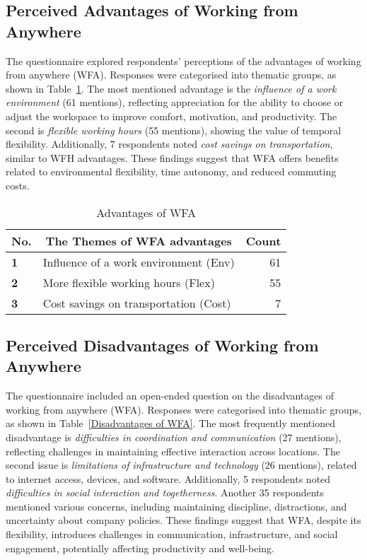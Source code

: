 \documentclass[a4paper, conference]{IEEEtran}
\begin{document}
\subsection{Perceived Advantages of Working from Anywhere}
\label{sec:advantage-wfa}

The questionnaire explored respondents' perceptions of the advantages of working from anywhere (WFA). Responses were categorised into thematic groups, as shown in Table~\ref{Advantages of WFA}. The most mentioned advantage is the \textit{influence of a work environment} (61 mentions), reflecting appreciation for the ability to choose or adjust the workspace to improve comfort, motivation, and productivity. The second is \textit{flexible working hours} (55 mentions), showing the value of temporal flexibility. Additionally, 7 respondents noted \textit{cost savings on transportation}, similar to WFH advantages. These findings suggest that WFA offers benefits related to environmental flexibility, time autonomy, and reduced commuting costs.


\begin{table}
	\centering
	\caption{Advantages of WFA}
	\label{Advantages of WFA}
	\begin{tabular}{|p{}|p{}|r|}
		\hline
		\multicolumn{1}{|c|}{\textbf{No.}} & \multicolumn{1}{c|}{\textbf{The Themes of WFA advantages}} & \multicolumn{1}{c|}{\textbf{Count}} \\ \hline
		\textbf{1} & Influence of a work environment (Env) & 61 %
		\\ \hline
		\textbf{2} &  More flexible working hours (Flex)       & 55 %
		\\ \hline
		\textbf{3} & Cost savings on transportation (Cost)      & 7 %
		\\ \hline
	\end{tabular}
\end{table}


\subsection{Perceived Disadvantages of Working from Anywhere}
\label{sec:disadvantage-wfa}

The questionnaire included an open-ended question on the disadvantages of working from anywhere (WFA). Responses were categorised into thematic groups, as shown in Table~\ref{Disadvantages of WFA}. The most frequently mentioned disadvantage is \textit{difficulties in coordination and communication} (27 mentions), reflecting challenges in maintaining effective interaction across locations. The second issue is \textit{limitations of infrastructure and technology} (26 mentions), related to internet access, devices, and software. Additionally, 5 respondents noted \textit{difficulties in social interaction and togetherness}. Another 35 respondents mentioned various concerns, including maintaining discipline, distractions, and uncertainty about company policies. These findings suggest that WFA, despite its flexibility, introduces challenges in communication, infrastructure, and social engagement, potentially affecting productivity and well-being.
\end{document}
